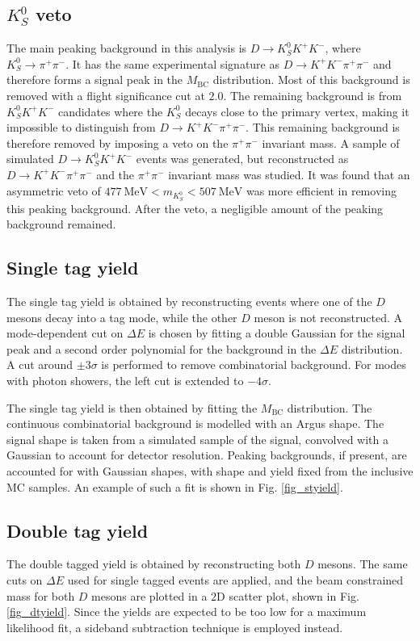 \documentclass[12pt, a4paper, notitlepage, onecolumn]{article}
\numberwithin{equation}{section}
\begin{document}
\subsection{\texorpdfstring{$K_S^0$}{KS0} veto}
\noindent The main peaking background in this analysis is $D\to K_S^0K^+K^-$, where $K_S^0\to\pi^+\pi^-$. It has the same experimental signature as $D\to K^+K^-\pi^+\pi^-$ and therefore forms a signal peak in the $M_\text{BC}$ distribution. Most of this background is removed with a flight significance cut at $2.0$. The remaining background is from $K_S^0K^+K^-$ candidates where the $K_S^0$ decays close to the primary vertex, making it impossible to distinguish from $D\to K^+K^-\pi^+\pi^-$. This remaining background is therefore removed by imposing a veto on the $\pi^+\pi^-$ invariant mass. A sample of simulated $D\to K_S^0K^+K^-$ events was generated, but reconstructed as $D\to K^+K^-\pi^+\pi^-$ and the $\pi^+\pi^-$ invariant mass was studied. It was found that an asymmetric veto of $\SI{477}{\mega\eV} < m_{K_S^0} < \SI{507}{\mega\eV}$ was more efficient in removing this peaking background. After the veto, a negligible amount of the peaking background remained.

\subsection{Single tag yield}
\noindent The single tag yield is obtained by reconstructing events where one of the $D$ mesons decay into a tag mode, while the other $D$ meson is not reconstructed. A mode-dependent cut on $\Delta E$ is chosen by fitting a double Gaussian for the signal peak and a second order polynomial for the background in the $\Delta E$ distribution. A cut around $\pm 3\sigma$ is performed to remove combinatorial background. For modes with photon showers, the left cut is extended to $-4\sigma$.

The single tag yield is then obtained by fitting the $M_\text{BC}$ distribution. The continuous combinatorial background is modelled with an Argus shape. The signal shape is taken from a simulated sample of the signal, convolved with a Gaussian to account for detector resolution. Peaking backgrounds, if present, are accounted for with Gaussian shapes, with shape and yield fixed from the inclusive MC samples. An example of such a fit is shown in Fig. \ref{fig_styield}.

\subsection{Double tag yield}
\noindent The double tagged yield is obtained by reconstructing both $D$ mesons. The same cuts on $\Delta E$ used for single tagged events are applied, and the beam constrained mass for both $D$ mesons are plotted in a $2$D scatter plot, shown in Fig. \ref{fig_dtyield}. Since the yields are expected to be too low for a maximum likelihood fit, a sideband subtraction technique is employed instead.
\end{document}
